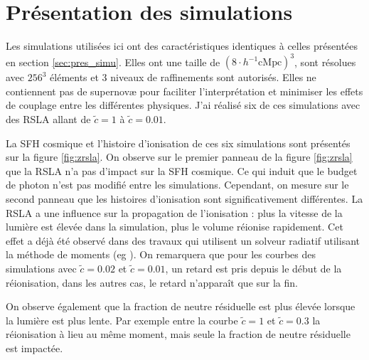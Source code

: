 \section{Présentation des simulations}

Les simulations utilisées ici ont des caractéristiques identiques à celles présentées en section \ref{sec:pres_simu}.
Elles ont une taille de $\left( 8 \cdot h^{-1} \mathrm{cMpc } \right)^3$, sont résolues avec $256^3$ éléments et 3 niveaux de raffinements sont autorisés.
Elles ne contiennent pas de supernovæ pour faciliter l'interprétation et minimiser les effets de couplage entre les différentes physiques.
J'ai réalisé six de ces simulations avec des \ac{RSLA} allant de $\tilde{c}=1$ à $\tilde{c}=0.01$.

La \ac{SFH} cosmique et l'histoire d'ionisation de ces six simulations sont présentés sur la figure \ref{fig:zrsla}.
On observe sur le premier panneau de la figure \ref{fig:zrsla} que la \ac{RSLA} n'a pas d'impact sur la \ac{SFH} cosmique.
Ce qui induit que le budget de photon n'est pas modifié entre les simulations.
Cependant, on mesure sur le second panneau que les histoires d'ionisation sont significativement différentes.%
La \ac{RSLA} a une influence sur la propagation de l'ionisation : plus la vitesse de la lumière est élevée dans la simulation, plus le volume réionise rapidement.
Cet effet a déjà été observé dans des travaux qui utilisent un solveur radiatif utilisant la méthode de moments (eg \cite{rosdahl_ramsesrt_2013}).
On remarquera que pour les courbes des simulations avec $\tilde{c}=0.02$ et $\tilde{c}=0.01$, un retard est pris depuis le début de la réionisation, dans les autres cas, le retard n’apparaît que sur la fin.

On observe également que la fraction de neutre résiduelle est plus élevée lorsque la lumière est plus lente.
Par exemple entre la courbe $\tilde{c}=1$ et $\tilde{c}=0.3$ la réionisation à lieu au même moment, mais seule la fraction de neutre résiduelle est impactée.


